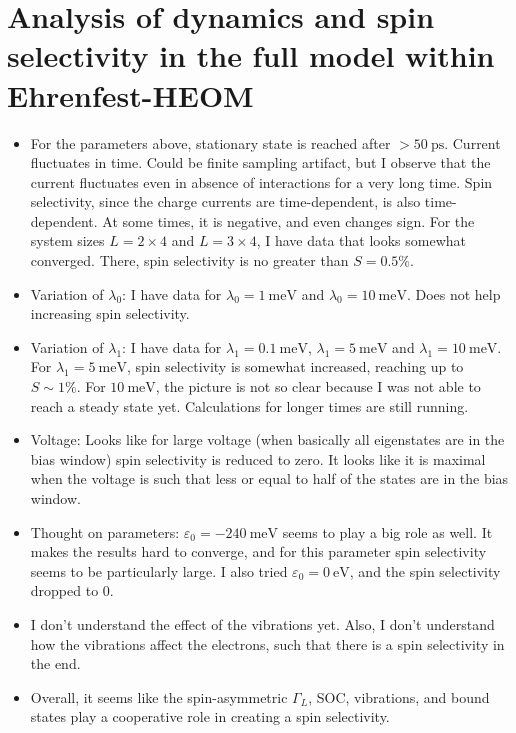 \documentclass{article}
\begin{document}
\section{Analysis of dynamics and spin selectivity in the full model within Ehrenfest-HEOM}
\begin{itemize}
	\item For the parameters above, stationary state is reached after $>\SI{50}{\pico\second}$. Current fluctuates in time. Could be finite sampling artifact, but I observe that the current fluctuates even in absence of interactions for a very long time. Spin selectivity, since the charge currents are time-dependent, is also time-dependent. At some times, it is negative, and even changes sign. For the system sizes $L=2\times 4$ and  $L=3\times 4$, I have data that looks somewhat converged. There, spin selectivity is no greater than $S=0.5\%$.  
	\item Variation of $\lambda_0$: I have data for $\lambda_0 = \SI{1}{\milli\electronvolt}$ and $\lambda_0 = \SI{10}{\milli\electronvolt}$. Does not help increasing spin selectivity.
	\item Variation of $\lambda_1$: I have data for $\lambda_1 = \SI{0.1}{\milli\electronvolt}$, $\lambda_1 = \SI{5}{\milli\electronvolt}$ and $\lambda_1 = \SI{10}{\milli\electronvolt}$. For $\lambda_1 = \SI{5}{\milli\electronvolt}$, spin selectivity is somewhat increased, reaching up to $S\sim 1\%$. For $\SI{10}{\milli\electronvolt}$, the picture is not so clear because I was not able to reach a steady state yet. Calculations for longer times are still running.
	\item Voltage: Looks like for large voltage (when basically all eigenstates are in the bias window) spin selectivity is reduced to zero. It looks like it is maximal when the voltage is such that less or equal to half of the states are in the bias window.
	\item Thought on parameters: $\varepsilon_0=-\SI{240}{\milli\electronvolt}$ seems to play a big role as well. It makes the results hard to converge, and for this parameter spin selectivity seems to be particularly large. I also tried $\varepsilon_0 = \SI{0}{\electronvolt}$, and the spin selectivity dropped to 0. 
	\item I don't understand the effect of the vibrations yet. Also, I don't understand how the vibrations affect the electrons, such that there is a spin selectivity in the end. 
	\item Overall, it seems like the spin-asymmetric $\Gamma_L$, SOC, vibrations, and bound states play a cooperative role in creating a spin selectivity.
\end{itemize}
\end{document}
